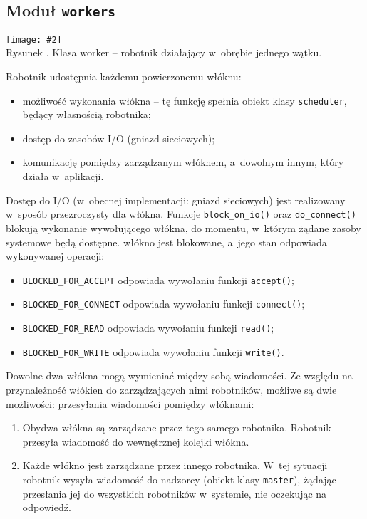 \documentclass[12pt]{mwart}
\newcommand{\code}{\texttt}
\newcommand{\procbr}{()}
\newcommand{\function}[1]{\code{#1\procbr}}
\newcounter{figmain}
\newcommand{\myownfigure}[4]{ \newcounter{#1} \setcounter{#1}{\value{figmain}} \addtocounter{figmain}{1} \begin{center} \label{fig:#1} \centering \texttt{[image: \#2]}\\ \nopagebreak[4] Rysunek \arabic{#1}. #3. \end{center}}
\begin{document}
\subsection{Moduł \code{workers}}
    \myownfigure{Worker}{Worker.png}{Klasa worker -- robotnik działający w~obrębie jednego wątku}{.7}
\indent
  Robotnik udostępnia każdemu powierzonemu włóknu:
  \begin{itemize}
    \item możliwość wykonania włókna -- tę funkcję spełnia obiekt klasy \code{scheduler}, będący własnością robotnika;
    \item dostęp do zasobów I/O (gniazd sieciowych);
    \item komunikację pomiędzy zarządzanym włóknem, a~dowolnym innym, który działa w~aplikacji.
  \end{itemize}
\par
\indent
  Dostęp do I/O (w~obecnej implementacji: gniazd sieciowych) jest realizowany w~sposób przezroczysty dla włókna. 
  Funkcje \function{block\_on\_io} oraz \function{do\_connect} blokują wykonanie wywołującego włókna, do momentu, w~którym 
  żądane zasoby systemowe będą dostępne. włókno jest blokowane, a~jego stan odpowiada wykonywanej operacji:
  \begin{itemize}
    \item \code{BLOCKED\_FOR\_ACCEPT} odpowiada wywołaniu funkcji \function{accept};
    \item \code{BLOCKED\_FOR\_CONNECT} odpowiada wywołaniu funkcji \function{connect};
    \item \code{BLOCKED\_FOR\_READ} odpowiada wywołaniu funkcji \function{read};
    \item \code{BLOCKED\_FOR\_WRITE} odpowiada wywołaniu funkcji \function{write}.
  \end{itemize}
\par
\indent
  Dowolne dwa włókna mogą wymieniać między sobą wiadomości. Ze względu na przynależność włókien do zarządzających nimi robotników, możliwe są dwie możliwości:
  przesyłania wiadomości pomiędzy włóknami:
  \begin{enumerate}
    \item Obydwa włókna są zarządzane przez tego samego robotnika. Robotnik przesyła wiadomość do wewnętrznej kolejki włókna.
    \item Każde włókno jest zarządzane przez innego robotnika. W~tej sytuacji robotnik wysyła wiadomość do nadzorcy (obiekt klasy \code{master}), żądając
      przesłania jej do wszystkich robotników w~systemie, nie oczekując na odpowiedź.
  \end{enumerate}
\end{document}
